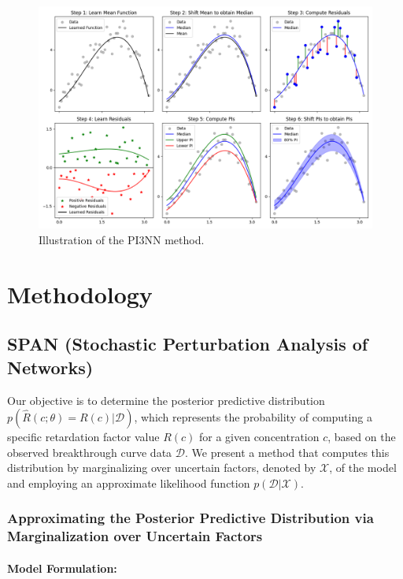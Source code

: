 \begin{figure}[h]
    \centering
    \includegraphics{figs/3pinn_illustration.png}
    \caption{Illustration of the PI3NN method.}
    \label{fig:3pinn_illustration}
\end{figure}





\section{Methodology}
\subsection{SPAN (Stochastic Perturbation Analysis of Networks)}
Our objective is to determine the posterior predictive distribution $p(\hat{R}(c; \theta) = R(c)| \mathcal{D})$, which represents the probability of computing a specific retardation factor value $R(c)$ for a given concentration $c$, based on the observed breakthrough curve data $\mathcal{D}$. We present a method that computes this distribution by marginalizing over uncertain factors, denoted by $\mathcal{X}$, of the model and employing an approximate likelihood function $p(\mathcal{D} | \mathcal{X})$.

\subsubsection{Approximating the Posterior Predictive Distribution via Marginalization over Uncertain Factors}

\paragraph{Model Formulation:}

